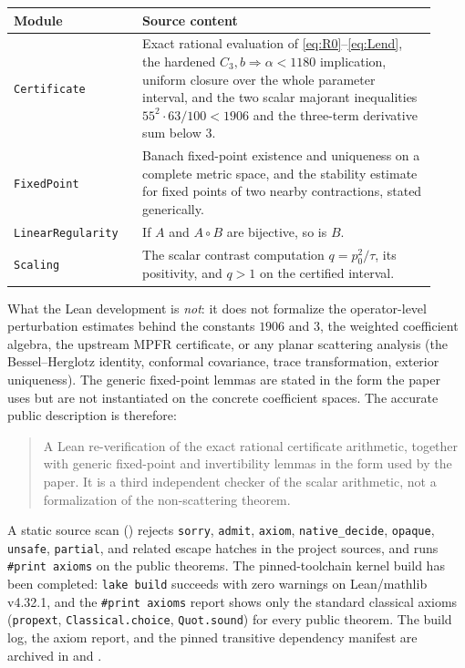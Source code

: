 \documentclass[11pt]{amsart}
\begin{document}
\begin{center}
\begin{tabular}{@{}>{\raggedright\arraybackslash}p{0.28\linewidth}>{\raggedright\arraybackslash}p{0.64\linewidth}@{}}
\toprule
Module & Source content \\
\midrule
\texttt{Certificate} & Exact rational evaluation of
\eqref{eq:R0}--\eqref{eq:Lend}, the hardened
$C_3,b\Rightarrow\alpha<1180$ implication, uniform closure over the whole
parameter interval, and the two scalar majorant inequalities
$55^2\cdot63/100<1906$ and the three-term derivative sum below $3$.\\
\texttt{FixedPoint} & Banach fixed-point existence and uniqueness on a
complete metric space, and the stability estimate for fixed points of two
nearby contractions, stated generically.\\
\texttt{LinearRegularity} & If $A$ and $A\circ B$ are bijective, so is
$B$.\\
\texttt{Scaling} & The scalar contrast computation $q=p_0^2/\tau$, its
positivity, and $q>1$ on the certified interval.\\
\bottomrule
\end{tabular}
\end{center}

What the Lean development is \emph{not}: it does not formalize the
operator-level perturbation estimates behind the constants $1906$ and $3$,
the weighted coefficient algebra, the upstream MPFR certificate, or any
planar scattering analysis (the Bessel--Herglotz identity, conformal
covariance, trace transformation, exterior uniqueness).  The generic
fixed-point lemmas are stated in the form the paper uses but are not
instantiated on the concrete coefficient spaces.  The accurate public
description is therefore:
\begin{quote}
A Lean re-verification of the exact rational certificate arithmetic,
together with generic fixed-point and invertibility lemmas in the form used
by the paper.  It is a third independent checker of the scalar arithmetic,
not a formalization of the non-scattering theorem.
\end{quote}

A static source scan ()
rejects \texttt{sorry}, \texttt{admit}, \texttt{axiom},
\texttt{native\_decide}, \texttt{opaque}, \texttt{unsafe},
\texttt{partial}, and related escape hatches in the project sources, and
 runs \texttt{\#print axioms} on the
public theorems.  The pinned-toolchain kernel build has been completed:
\texttt{lake build} succeeds with zero warnings on Lean/mathlib v4.32.1,
and the \texttt{\#print axioms} report shows only the standard classical
axioms (\texttt{propext}, \texttt{Classical.choice},
\texttt{Quot.sound}) for every public theorem.  The build log, the axiom
report, and the pinned transitive dependency manifest are archived in
 and
.
\end{document}
